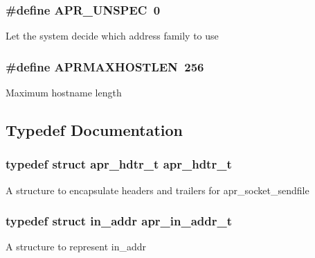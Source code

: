 \subsubsection[{\texorpdfstring{A\+P\+R\+\_\+\+U\+N\+S\+P\+EC}{APR_UNSPEC}}]{\setlength{\rightskip}{0pt plus 5cm}\#define A\+P\+R\+\_\+\+U\+N\+S\+P\+EC~0}\hypertarget{group__apr__network__io_gaa7a33b17a7d0820b09ef489bd3328f85}{}\label{group__apr__network__io_gaa7a33b17a7d0820b09ef489bd3328f85}
Let the system decide which address family to use 
\subsubsection[{\texorpdfstring{A\+P\+R\+M\+A\+X\+H\+O\+S\+T\+L\+EN}{APRMAXHOSTLEN}}]{\setlength{\rightskip}{0pt plus 5cm}\#define A\+P\+R\+M\+A\+X\+H\+O\+S\+T\+L\+EN~256}\hypertarget{group__apr__network__io_ga7f5b3882209106bb407b1d518d6ad59d}{}\label{group__apr__network__io_ga7f5b3882209106bb407b1d518d6ad59d}
Maximum hostname length 

\subsection{Typedef Documentation}
\subsubsection[{\texorpdfstring{apr\+\_\+hdtr\+\_\+t}{apr_hdtr_t}}]{\setlength{\rightskip}{0pt plus 5cm}typedef struct {\bf apr\+\_\+hdtr\+\_\+t} {\bf apr\+\_\+hdtr\+\_\+t}}\hypertarget{group__apr__network__io_ga97887d5358a9c79c241ccafab61d8ff5}{}\label{group__apr__network__io_ga97887d5358a9c79c241ccafab61d8ff5}
A structure to encapsulate headers and trailers for apr\+\_\+socket\+\_\+sendfile 
\subsubsection[{\texorpdfstring{apr\+\_\+in\+\_\+addr\+\_\+t}{apr_in_addr_t}}]{\setlength{\rightskip}{0pt plus 5cm}typedef struct in\+\_\+addr {\bf apr\+\_\+in\+\_\+addr\+\_\+t}}\hypertarget{group__apr__network__io_gad30d6c55a354a9a2e0a8747abb0c8176}{}\label{group__apr__network__io_gad30d6c55a354a9a2e0a8747abb0c8176}
A structure to represent in\+\_\+addr 
